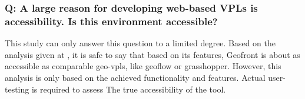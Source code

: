 





\subsubsection*{Q: A large reason for developing web-based VPLs is accessibility.  Is this environment accessible?}

This study can only answer this question to a limited degree. 
Based on the analysis given at , it is safe to say that based on its features, Geofront is about as accessible as comparable geo-vpls, like geoflow or grasshopper. 
However, this analysis is only based on the achieved functionality and features. 
Actual user-testing is required to assess The true accessibility of the tool.

